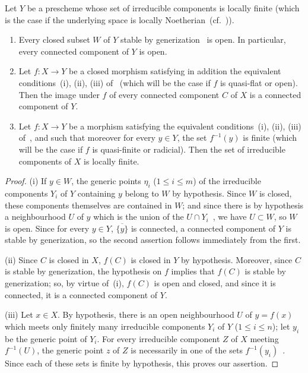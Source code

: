\begin{proposition}[2.3.6]
\label{IV.2.3.6}
Let $Y$ be a prescheme whose set of irreducible components is locally finite \textnormal{(}which is the case if the underlying space is locally Noetherian~(cf.~)\textnormal{)}.
\begin{enumerate}
  \item[(i)] Every closed subset $W$ of $Y$ stable by generization~ is open. In particular, every connected component of $Y$ is open.
  \item[(ii)] Let $f:X\to Y$ be a closed morphism satisfying in addition the equivalent conditions~(i), (ii), (iii) of~ \textnormal{(}which will be the case if $f$ is quasi-flat or open\textnormal{)}. Then the image under $f$ of every connected component $C$ of $X$ is a connected component of $Y$.
  \item[(iii)] Let $f:X\to Y$ be a morphism satisfying the equivalent conditions~(i), (ii), (iii) of~, and such that moreover for every $y\in Y$, the set $f^{-1}(y)$ is finite \textnormal{(}which will be the case if $f$ is quasi-finite or radicial\textnormal{)}. Then the set of irreducible components of $X$ is locally finite.
\end{enumerate}
\end{proposition}

\begin{proof}
(i) If $y\in W$, the generic points $\eta_i$ ($1\leq i\leq m$) of the irreducible components $Y_i$ of $Y$ containing $y$ belong to $W$ by hypothesis.
Since $W$ is closed, these components themselves are contained in $W$; and since there is by hypothesis a neighbourhood $U$ of $y$ which is the union of the $U\cap Y_i$~, we have $U\subset W$, so $W$ is open.
Since for every $y\in Y$, $\overline{\{y\}}$ is connected, a connected component of $Y$ is stable by generization, so the second assertion follows immediately from the first.

(ii) Since $C$ is closed in $X$, $f(C)$ is closed in $Y$ by hypothesis.
Moreover, since $C$ is stable by generization, the hypothesis on $f$ implies that $f(C)$ is stable by generization; so, by virtue of~(i), $f(C)$ is open and closed, and since it is connected, it is a connected component of $Y$.

(iii) Let $x\in X$.
By hypothesis, there is an open neighbourhood $U$ of $y=f(x)$ which meets only finitely many irreducible components $Y_i$ of $Y$ ($1\leq i\leq n$); let $y_i$ be the generic point of $Y_i$.
For every irreducible component $Z$ of $X$ meeting $f^{-1}(U)$, the generic point $z$ of $Z$ is necessarily in one of the sets $f^{-1}(y_i)$~.
Since each of these sets is finite by hypothesis, this proves our assertion.
\end{proof}

